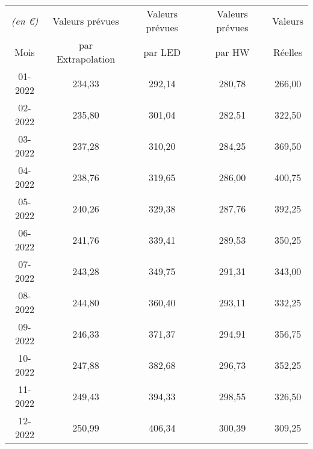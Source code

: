 \begin{tabular}{ccccc}
\toprule
\textit{(en \euro)} & Valeurs prévues & Valeurs prévues & Valeurs prévues & Valeurs \\
Mois  & par Extrapolation & par LED & par HW & Réelles \\
\cmidrule(lr){1-1}\cmidrule(lr){2-4}\cmidrule(lr){5-5}
01-2022 & 234,33 & 292,14 & 280,78 & 266,00 \\
02-2022 & 235,80 & 301,04 & 282,51 & 322,50 \\
03-2022 & 237,28 & 310,20 & 284,25 & 369,50 \\
04-2022 & 238,76 & 319,65 & 286,00 & 400,75 \\
05-2022 & 240,26 & 329,38 & 287,76 & 392,25 \\
06-2022 & 241,76 & 339,41 & 289,53 & 350,25 \\
07-2022 & 243,28 & 349,75 & 291,31 & 343,00 \\
08-2022 & 244,80 & 360,40 & 293,11 & 332,25 \\
09-2022 & 246,33 & 371,37 & 294,91 & 356,75 \\
10-2022 & 247,88 & 382,68 & 296,73 & 352,25 \\
11-2022 & 249,43 & 394,33 & 298,55 & 326,50 \\
12-2022 & 250,99 & 406,34 & 300,39 & 309,25 \\
\bottomrule
\end{tabular}%
